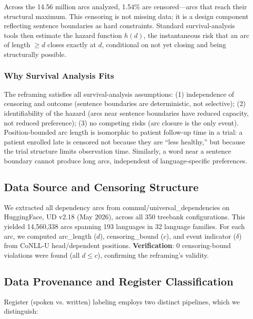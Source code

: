 \documentclass[11pt,letterpaper]{article}
\begin{document}
Across the 14.56 million arcs analyzed, 1.54\% are censored---arcs that reach their structural maximum. This censoring is not missing data; it is a design component reflecting sentence boundaries as hard constraints. Standard survival-analysis tools then estimate the hazard function $h(d)$, the instantaneous risk that an arc of length $\geq d$ closes exactly at $d$, conditional on not yet closing and being structurally possible.

\subsubsection{Why Survival Analysis Fits}

The reframing satisfies all survival-analysis assumptions: (1) independence of censoring and outcome (sentence boundaries are deterministic, not selective); (2) identifiability of the hazard (arcs near sentence boundaries have reduced capacity, not reduced preference); (3) no competing risks (arc closure is the only event). Position-bounded arc length is isomorphic to patient follow-up time in a trial: a patient enrolled late is censored not because they are ``less healthy,'' but because the trial structure limits observation time. Similarly, a word near a sentence boundary cannot produce long arcs, independent of language-specific preferences.

\subsection{Data Source and Censoring Structure}

We extracted all dependency arcs from commul/universal\_dependencies on HuggingFace, UD v2.18 (May 2026), across all 350 treebank configurations. This yielded 14,560,338 arcs spanning 193 languages in 32 language families. For each arc, we computed arc\_length ($d$), censoring\_bound ($c$), and event indicator ($\delta$) from CoNLL-U head/dependent positions. \textbf{Verification}: 0 censoring-bound violations were found (all $d \leq c$), confirming the reframing's validity.

\subsection{Data Provenance and Register Classification}

Register (spoken vs. written) labeling employs two distinct pipelines, which we distinguish:
\end{document}
